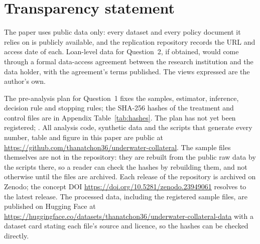 \section{Transparency statement}\label{sec:transparency}

The paper uses public data only: every dataset and every policy document it relies on is publicly available, and the replication repository records the URL and access date of each. Loan-level data for Question~2, if obtained, would come through a formal data-access agreement between the research institution and the data holder, with the agreement's terms published. The views expressed are the author's own.

The pre-analysis plan for Question~1 fixes the samples, estimator, inference, decision rule and stopping rules; the SHA-256 hashes of the \hashFiles{} treatment and control files are in Appendix Table~\ref{tab:hashes}. The plan has not yet been registered; . All analysis code, synthetic data and the scripts that generate every number, table and figure in this paper are public at \url{https://github.com/thanatchon36/underwater-collateral}. The sample files themselves are not in the repository: they are rebuilt from the public raw data by the scripts there, so a reader can check the hashes by rebuilding them, and not otherwise until the files are archived. Each release of the repository is archived on Zenodo; the concept DOI \url{https://doi.org/10.5281/zenodo.23949061} resolves to the latest release. The processed data, including the \hashFiles{} registered sample files, are published on Hugging Face at \url{https://huggingface.co/datasets/thanatchon36/underwater-collateral-data} with a dataset card stating each file's source and licence, so the hashes can be checked directly. 
